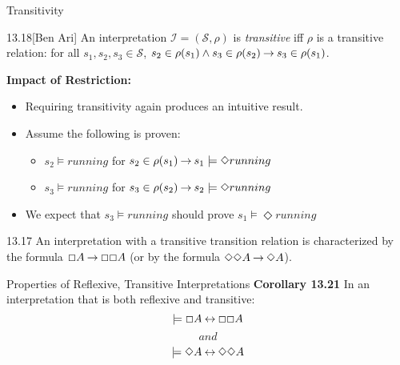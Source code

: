 \begin{wideslide}[bm=,toc=]{Transitivity}
\begin{defn}{13.18}[Ben Ari]
An interpretation $\mathcal{I} = (\mathcal{S},\rho)$ is \emph{transitive}
iff $\rho$ is a transitive relation: for all $s_1,s_2,s_3 \in \mathcal{S}$, 
$s_2 \in \rho(s_1) \land s_3 \in \rho(s_2) \mathbin{\rightarrow} s_3 \in \rho(s_1)$.
\end{defn}
{\bf Impact of Restriction:}
\begin{itemize}
\item Requiring transitivity again produces an intuitive result.
\item Assume the following is proven:
\begin{itemize}
\item $s_2 \models running$ for $s_2 \in \rho(s_1) \mathbin{\rightarrow} s_1 \models \Diamond running$
\item $s_3 \models running$ for $s_3 \in \rho(s_2) \mathbin{\rightarrow} s_2 \models \Diamond running$
\end{itemize}
\item We expect that $s_3 \models running$ should prove $s_1 \models \Diamond running$ 
\end{itemize}
\begin{thm}{13.17}
An interpretation with a transitive transition relation is characterized by the
formula $\Box A \mathbin{\rightarrow} \Box \Box A$ (or by the formula 
$\Diamond \Diamond A \mathbin{\rightarrow} \Diamond A$).
\end{thm}
\end{wideslide}
\begin{wideslide}[bm=,toc=]{Properties of Reflexive, Transitive Interpretations}
{\bf Corollary 13.21}
In an interpretation that is both reflexive and transitive:
\[
\models \Box A \mathbin{\leftrightarrow} \Box \Box A
\]
\[and\]
\[
\models \Diamond A \mathbin{\leftrightarrow} \Diamond \Diamond A
\]

\end{wideslide}


